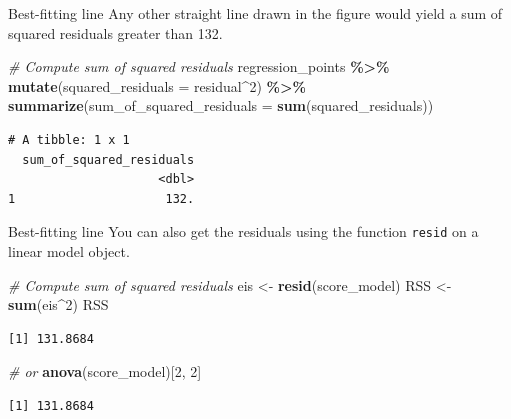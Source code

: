 \documentclass[
  ignorenonframetext,
]{beamer}
\newenvironment{Shaded}{\begin{snugshade}}{\end{snugshade}}
\newcommand{\AttributeTok}[1]{\textcolor[rgb]{0.13,0.29,0.53}{#1}}
\newcommand{\CommentTok}[1]{\textcolor[rgb]{0.56,0.35,0.01}{\textit{#1}}}
\newcommand{\DecValTok}[1]{\textcolor[rgb]{0.00,0.00,0.81}{#1}}
\newcommand{\FunctionTok}[1]{\textcolor[rgb]{0.13,0.29,0.53}{\textbf{#1}}}
\newcommand{\NormalTok}[1]{#1}
\newcommand{\OtherTok}[1]{\textcolor[rgb]{0.56,0.35,0.01}{#1}}
\newcommand{\SpecialCharTok}[1]{\textcolor[rgb]{0.81,0.36,0.00}{\textbf{#1}}}
\begin{document}
\begin{frame}[fragile]{Best-fitting line}
\protect\hypertarget{best-fitting-line-3}{}
Any other straight line drawn in the figure would yield a sum of squared
residuals greater than 132.

\normalsize

\begin{Shaded}
\begin{Highlighting}[]
\CommentTok{\# Compute sum of squared residuals}
\NormalTok{regression\_points }\SpecialCharTok{\%\textgreater{}\%}
  \FunctionTok{mutate}\NormalTok{(}\AttributeTok{squared\_residuals =}\NormalTok{ residual}\SpecialCharTok{\^{}}\DecValTok{2}\NormalTok{) }\SpecialCharTok{\%\textgreater{}\%}
  \FunctionTok{summarize}\NormalTok{(}\AttributeTok{sum\_of\_squared\_residuals =} \FunctionTok{sum}\NormalTok{(squared\_residuals))}
\end{Highlighting}
\end{Shaded}

\begin{verbatim}
# A tibble: 1 x 1
  sum_of_squared_residuals
                     <dbl>
1                     132.
\end{verbatim}

\normalsize
\end{frame}

\begin{frame}[fragile]{Best-fitting line}
\protect\hypertarget{best-fitting-line-4}{}
You can also get the residuals using the function \texttt{resid} on a
linear model object.

\normalsize

\begin{Shaded}
\begin{Highlighting}[]
\CommentTok{\# Compute sum of squared residuals}
\NormalTok{eis }\OtherTok{\textless{}{-}} \FunctionTok{resid}\NormalTok{(score\_model)}
\NormalTok{RSS }\OtherTok{\textless{}{-}} \FunctionTok{sum}\NormalTok{(eis}\SpecialCharTok{\^{}}\DecValTok{2}\NormalTok{)}
\NormalTok{RSS}
\end{Highlighting}
\end{Shaded}

\begin{verbatim}
[1] 131.8684
\end{verbatim}

\begin{Shaded}
\begin{Highlighting}[]
\CommentTok{\# or}
\FunctionTok{anova}\NormalTok{(score\_model)[}\DecValTok{2}\NormalTok{, }\DecValTok{2}\NormalTok{]}
\end{Highlighting}
\end{Shaded}

\begin{verbatim}
[1] 131.8684
\end{verbatim}

\normalsize
\end{frame}
\end{document}
